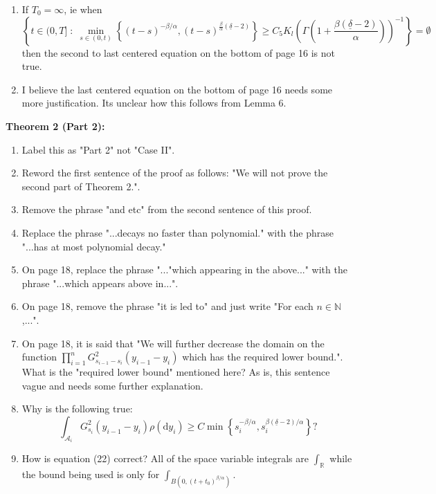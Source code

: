 \documentclass[a4paper,11pt]{article}
\numberwithin{equation}{section}
\numberwithin{equation}{section}
\theoremstyle{plain}
\theoremstyle{definition}
\newcommand{\ud}{\ensuremath{\mathrm{d} }}
\newcommand{\R}{\mathbb{R}}
\begin{document}
\begin{enumerate}
	\item
If $T_0 = \infty$, ie when 
	\[
		\left\{t \in (0,T] \; : \; \min_{s \in (0,t)}\left\{ (t-s)^{-\beta/\alpha}, (t-s)^{\frac{\beta}{\alpha}(\underline{\delta}-2)} \right\} \ge C_5K_l \left(\Gamma\left(1 + \frac{\beta(\underline{\delta}-2)}{\alpha}\right) \right)^{-1} \right\} = \emptyset
	\]
then the second to last centered equation on the bottom of page 16 is not true.

	\item
I believe the last centered equation on the bottom of page 16 needs some more justification. Its unclear how this follows from Lemma 6. 
\end{enumerate}

\textbf{Theorem 2 (Part 2):}
\begin{enumerate}
	\item 
Label this as "Part 2" not "Case II". 

	\item
 Reword the first sentence of the proof as follows: "We will not prove the second part of Theorem 2.".
 
 	\item 
 Remove the phrase "and etc" from the second sentence of this proof.
 
 	\item 
 Replace the phrase "...decays no faster than polynomial." with the phrase "...has at most polynomial decay."
 
 	\item 
 On page 18, replace the phrase "..."which appearing in the above..." with the phrase "...which appears above in...".
 
 	\item 
 On page 18, remove the phrase "it is led to" and just write "For each $n\in\mathbb{N}$,...".
 
 	\item 
 On page 18, it is said that "We will further decrease the domain on the function $\prod_{i=1}^n G_{s_{i-1}-s_i}^2(y_{i-1}-y_i)$ which has the required lower bound.". What is the "required lower bound" mentioned here? As is, this sentence vague and needs some further explanation. 
 
 	\item
Why is the following true: 
	\[
 	\int_{\mathcal{A}_i} G_{s_i}^2(y_{i-1}-y_i)\rho(\ud y_i) \ge C \min\left\{ s_i^{-\beta/\alpha}, s_i^{\beta(\underline{\delta}-2)/\alpha} \right\}?
	\]

	\item 
How is equation (22) correct? All of the space variable integrals are $\int_{\R}$ while the bound being used is only for $\int_{B(0,(t+t_0)^{\beta/\alpha})}$. 
\end{enumerate}
\end{document}
